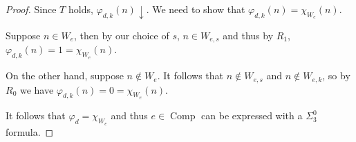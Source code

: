 \documentclass{article}
\newcommand{\terminates}{\!\!\downarrow}
\DeclareMathOperator{\Comp}{Comp}
\begin{document}
\begin{proof}
    Since $T$ holds, $\varphi_{d, k}(n)\terminates$.  We need to show that $\varphi_{d, k}(n) = \chi_{W_e}(n)$.

    Suppose $n \in W_e$, then by our choice of $s$, $n \in W_{e, s}$ and thus by $R_1$, $\varphi_{d, k}(n) = 1 = \chi_{W_e}(n)$.

    On the other hand, suppose $n \not \in W_e$.  It follows that $n \not \in W_{e, s}$ and $n \not \in W_{e, k}$, so by
    $R_0$ we have $\varphi_{d, k}(n) = 0 = \chi_{W_e}(n)$.

    It follows that $\varphi_d = \chi_{W_e}$ and thus $e \in \Comp$ can be expressed with a $\Sigma^0_3$ formula.
  \end{proof}
\end{document}
